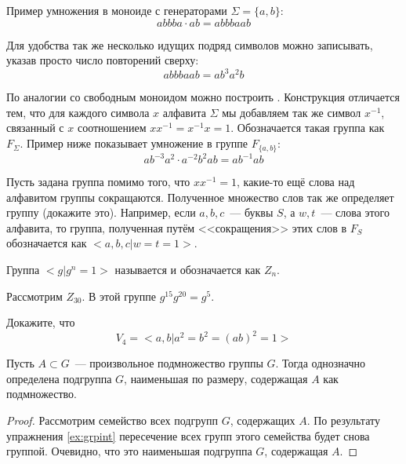 \begin{example}
	Пример умножения в моноиде с генераторами $\Sigma=\{a, b\}$:
	\[
	abbba\cdot ab = abbbaab
	\]
\end{example}

Для удобства так же несколько идущих подряд символов можно записывать, указав просто число повторений сверху:
\[
abbbaab = ab^3a^2b
\]

\begin{example}
	По аналогии со свободным моноидом можно построить . Конструкция отличается тем, что для каждого символа $x$ алфавита $\Sigma$ мы добавляем так же  символ $x^{-1}$, связанный с $x$ соотношением $xx^{-1}=x^{-1}x=1$. Обозначается такая группа как $F_\Sigma$. Пример ниже показывает умножение в группе $F_{\{a, b\}}$:
	\[
	ab^{-3}a^2\cdot a^{-2}b^2ab = ab^{-1}ab
	\]
\end{example}

Пусть задана группа помимо того, что $xx^{-1}=1$, какие-то ещё слова над алфавитом группы сокращаются. Полученное множество слов так же определяет группу (докажите это). Например, если $a, b, c$~--- буквы $S$, а $w, t$~--- слова этого алфавита, то группа, полученная путём <<сокращения>> этих слов в $F_S$ обозначается как $<a, b, c | w = t = 1>$.

\begin{example}
	Группа $<g|g^n = 1>$ называется  и обозначается как $Z_n$.
\end{example}

\begin{example}
	Рассмотрим $Z_{30}$. В этой группе $g^{15}g^{20} = g^5$.
\end{example}

\begin{exercise}
	Докажите, что
	\[
	V_4 = <a, b | a^2 = b^2 = (ab)^2 = 1>
	\]
\end{exercise}

\begin{thm}
	Пусть $A\subset G$~--- произвольное подмножество группы $G$. Тогда однозначно определена подгруппа $G$, наименьшая по размеру, содержащая $A$ как подмножество.
\end{thm}
\begin{proof}
	Рассмотрим семейство всех подгрупп $G$, содержащих $A$. По результату упражнения \ref{ex:grpint} пересечение всех групп этого семейства будет снова группой. Очевидно, что это наименьшая подгруппа $G$, содержащая $A$.
\end{proof}

